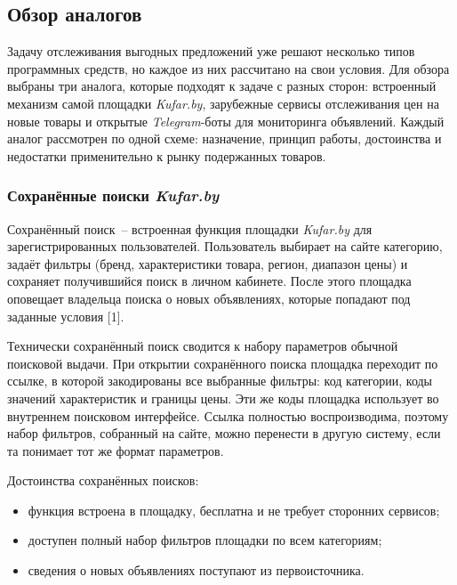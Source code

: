 \subsection{Обзор аналогов}
\label{sec:analysis:analogues}

Задачу отслеживания выгодных предложений уже решают несколько типов программных средств, но каждое из них рассчитано на свои условия. Для обзора выбраны три аналога, которые подходят к задаче с разных сторон: встроенный механизм самой площадки \textit{Kufar.by}, зарубежные сервисы отслеживания цен на новые товары и открытые \textit{Telegram}-боты для мониторинга объявлений. Каждый аналог рассмотрен по одной схеме: назначение, принцип работы, достоинства и недостатки применительно к рынку подержанных товаров.

\subsubsection{Сохранённые поиски \textit{Kufar.by}}

Сохранённый поиск~-- встроенная функция площадки \textit{Kufar.by} для зарегистрированных пользователей. Пользователь выбирает на сайте категорию, задаёт фильтры (бренд, характеристики товара, регион, диапазон цены) и сохраняет получившийся поиск в личном кабинете. После этого площадка оповещает владельца поиска о новых объявлениях, которые попадают под заданные условия [1].

Технически сохранённый поиск сводится к набору параметров обычной поисковой выдачи. При открытии сохранённого поиска площадка переходит по ссылке, в которой закодированы все выбранные фильтры: код категории, коды значений характеристик и границы цены. Эти же коды площадка использует во внутреннем поисковом интерфейсе. Ссылка полностью воспроизводима, поэтому набор фильтров, собранный на сайте, можно перенести в другую систему, если та понимает тот же формат параметров.

Достоинства сохранённых поисков:
\begin{itemize}
	\item функция встроена в площадку, бесплатна и не требует сторонних сервисов;
	\item доступен полный набор фильтров площадки по всем категориям;
	\item сведения о новых объявлениях поступают из первоисточника.
\end{itemize}


